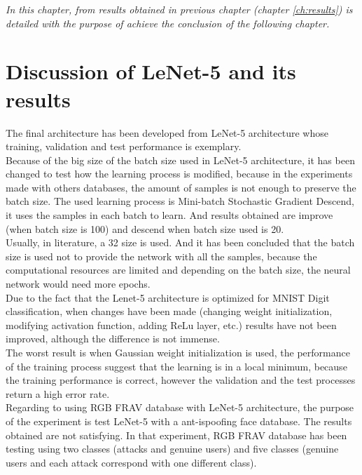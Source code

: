 
\begin{small}
\emph{In this chapter, from results obtained in previous chapter (chapter \ref{ch:results}) is detailed with the purpose of achieve the conclusion of the following chapter.\\}
\end{small}

\section{Discussion of LeNet-5 and its results}
The final architecture has been developed from LeNet-5 architecture whose training, validation and test performance is exemplary.\\

Because of the big size of the batch size used in LeNet-5 architecture, it has been changed to test how the learning process is modified, because in the experiments made with others databases, the amount of samples is not enough to preserve the batch size. The used learning process is Mini-batch Stochastic Gradient Descend, it uses the samples in each batch to learn. And results obtained are improve (when batch size is 100) and descend when batch size used is 20. \\

Usually, in literature, a 32 size is used. And it has been concluded that the batch size is used not to provide the network with all the samples, because the computational resources are limited and depending on the batch size, the neural network would need more epochs.\\

Due to the fact that the Lenet-5 architecture is optimized for MNIST Digit classification, when changes have been made (changing weight initialization, modifying activation function, adding ReLu layer, etc.) results have not been improved, although the difference is not immense.\\

The worst result is when Gaussian weight initialization is used, the performance of the training process suggest that the learning is in a local minimum, because the training performance is correct, however the validation  and the test processes return a high error rate.\\

Regarding to using RGB FRAV database with LeNet-5 architecture, the purpose of the experiment is test LeNet-5 with a ant-ispoofing face database. The  results obtained are not satisfying. In that experiment, RGB FRAV database has been testing using two classes (attacks and genuine users) and five classes (genuine users and each attack correspond with one different class).\\

